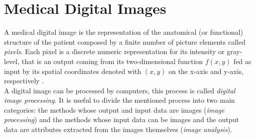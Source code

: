 \documentclass{standalone}
\begin{document}
\chapter{Medical Digital Images}

A medical digital image is the representation of the anatomical (or functional) structure of the patient composed by a finite number of picture elements called \textit{pixels}. 
Each pixel is a discrete numeric representation for its intensity or gray-level, that is an output coming from its two-dimensional function $f(x, y)$ fed as input by its spatial coordinates denoted with $(x, y)$ on the x-axis and y-axis, respectively \cite{Gonzalez}.\\
A digital image can be processed by computers, this process is called \textit{digital image processing}.
It is useful to divide the mentioned process into two main categories: the methods whose output and input data are images (\textit{image processing}) and the methods whose input data can be images and the output data are attributes extracted from the images themselves (\textit{image analysis}).\\
\end{document}
